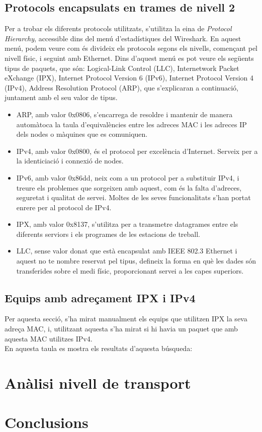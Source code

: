 \documentclass{article}
\begin{document}
\subsection{Protocols encapsulats en trames de nivell 2}
Per a trobar els diferents protocols utilitzats, s'utilitza la eina de
\textit{Protocol Hierarchy}, accessible dins del menú d'estadístiques del
Wireshark. En aquest menú, podem veure com és divideix els protocols segons els
nivells, començant pel nivell físic, i seguint amb Ethernet. Dins d'aquest menú
es pot veure els següents tipus de paquets, que són: Logical-Link Control (LLC),
Internetwork Packet eXchange (IPX), Internet Protocol Version 6 (IPv6),
Internet Protocol Version 4 (IPv4), Address Resolution Protocol (ARP), que
s'explicaran a continuació, juntament amb el seu valor de tipus.\\
\begin{itemize}
\item ARP, amb valor 0x0806, s'encarrega de resoldre i mantenir de manera automàtoca
la taula d'equivalències entre les adreces MAC i les adreces IP dels nodes o màquines
que es comuniquen.
\item IPv4, amb valor 0x0800, és el protocol per excelència d'Internet. Serveix
per a la identiciació i connexió de nodes.
\item IPv6, amb valor 0x86dd, neix com a un protocol per a substituir IPv4, i
treure els problemes que sorgeixen amb aquest, com és la falta d'adreces, seguretat i
qualitat de servei. Moltes de les seves funcionalitats s'han portat enrere per al
protocol de IPv4.
\item IPX, amb valor 0x8137, s'utilitza per a transmetre datagrames entre els
diferents serviors i els programes de les estacions de treball.
\item LLC, sense valor donat que està encapsulat amb IEEE 802.3 Ethernet i aquest
no te nombre reservat pel tipus, defineix la forma en què les dades són transferides
sobre el medi físic, proporcionant servei a les capes superiors.
\end{itemize}
\subsection{Equips amb adreçament IPX i IPv4}
Per aquesta secció, s'ha mirat manualment els equips que utilitzen IPX la seva adreça MAC,
i, utilitzant aquesta s'ha mirat si hi havia un paquet que amb aquesta MAC utilitzes IPv4.\\
En aquesta taula es mostra els resultats d'aquesta búsqueda:\\
\section{Anàlisi nivell de transport}
\section{Conclusions}
\end{document}
